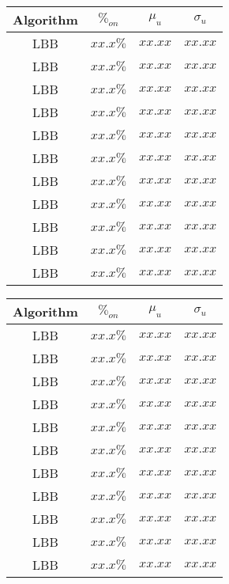 \begin{table*}
\centering
\caption{Performance indicators for the experiments changing infrastructure resources}
\label{tab:resourcechanges-case2}
\begin{tabular}{c c c c}
\hline
Algorithm & $\%_{on}$ & $\mu_u$ & $\sigma_u$ \\
\hline
LBB & $xx.x\%$ & $xx.xx$ & $xx.xx$ \\
LBB & $xx.x\%$ & $xx.xx$ & $xx.xx$ \\
LBB & $xx.x\%$ & $xx.xx$ & $xx.xx$ \\
LBB & $xx.x\%$ & $xx.xx$ & $xx.xx$ \\
LBB & $xx.x\%$ & $xx.xx$ & $xx.xx$ \\
LBB & $xx.x\%$ & $xx.xx$ & $xx.xx$ \\
LBB & $xx.x\%$ & $xx.xx$ & $xx.xx$ \\
LBB & $xx.x\%$ & $xx.xx$ & $xx.xx$ \\
LBB & $xx.x\%$ & $xx.xx$ & $xx.xx$ \\
LBB & $xx.x\%$ & $xx.xx$ & $xx.xx$ \\
LBB & $xx.x\%$ & $xx.xx$ & $xx.xx$ \\
\hline
\end{tabular}
\hspace{1cm}
\begin{tabular}{c c c c}
\hline
Algorithm & $\%_{on}$ & $\mu_u$ & $\sigma_u$ \\
\hline
LBB & $xx.x\%$ & $xx.xx$ & $xx.xx$ \\
LBB & $xx.x\%$ & $xx.xx$ & $xx.xx$ \\
LBB & $xx.x\%$ & $xx.xx$ & $xx.xx$ \\
LBB & $xx.x\%$ & $xx.xx$ & $xx.xx$ \\
LBB & $xx.x\%$ & $xx.xx$ & $xx.xx$ \\
LBB & $xx.x\%$ & $xx.xx$ & $xx.xx$ \\
LBB & $xx.x\%$ & $xx.xx$ & $xx.xx$ \\
LBB & $xx.x\%$ & $xx.xx$ & $xx.xx$ \\
LBB & $xx.x\%$ & $xx.xx$ & $xx.xx$ \\
LBB & $xx.x\%$ & $xx.xx$ & $xx.xx$ \\
LBB & $xx.x\%$ & $xx.xx$ & $xx.xx$ \\
\hline
\end{tabular}
\end{table*}
